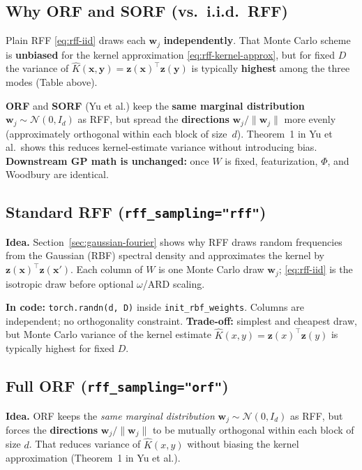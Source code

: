 \documentclass[11pt]{article}
\newcommand{\Ph}{\Phi}
\begin{document}
\subsection{Why ORF and SORF (vs.\ i.i.d.\ RFF)}
\label{sec:why-orf-sorf}

Plain RFF \eqref{eq:rff-iid} draws each $\mathbf w_j$ \textbf{independently}.
That Monte Carlo scheme is \textbf{unbiased} for the kernel approximation \eqref{eq:rff-kernel-approx},
but for fixed $D$ the variance of $\hat K(\mathbf x,\mathbf y)=\mathbf z(\mathbf x)^{\top}\mathbf z(\mathbf y)$
is typically \textbf{highest} among the three modes (Table above).

\textbf{ORF} and \textbf{SORF} (Yu et al.) keep the \textbf{same marginal distribution}
$\mathbf w_j\sim\mathcal N(0,I_d)$ as RFF, but spread the \textbf{directions}
$\mathbf w_j/\|\mathbf w_j\|$ more evenly (approximately orthogonal within each block of size~$d$).
Theorem~1 in Yu et al.\ shows this reduces kernel-estimate variance without introducing bias.
\textbf{Downstream GP math is unchanged:} once $W$ is fixed, featurization, $\Ph$, and Woodbury are identical.

\subsection{Standard RFF (\texttt{rff\_sampling="rff"})}
\label{sec:rff-iid}

\textbf{Idea.} Section~\ref{sec:gaussian-fourier} shows why RFF draws random frequencies from the Gaussian (RBF) spectral density and approximates the kernel by $\mathbf z(\mathbf x)^{\top}\mathbf z(\mathbf x')$.
Each column of $W$ is one Monte Carlo draw $\mathbf w_j$; \eqref{eq:rff-iid} is the isotropic draw before optional $\omega$/ARD scaling.

\textbf{In code:} \texttt{torch.randn(d, D)} inside \texttt{init\_rbf\_weights}.
Columns are independent; no orthogonality constraint.
\textbf{Trade-off:} simplest and cheapest draw, but Monte Carlo variance of the kernel estimate
$\hat K(x,y)=\mathbf z(x)^{\top}\mathbf z(y)$ is typically highest for fixed $D$.

\subsection{Full ORF (\texttt{rff\_sampling="orf"})}
\label{sec:orf}

\textbf{Idea.} ORF keeps the \emph{same marginal distribution} $\mathbf w_j\sim\mathcal N(0,I_d)$ as RFF,
but forces the \textbf{directions} $\mathbf w_j/\|\mathbf w_j\|$ to be mutually orthogonal within each
block of size $d$. That reduces variance of $\hat K(x,y)$ without biasing the kernel approximation
(Theorem~1 in Yu et al.).
\end{document}
